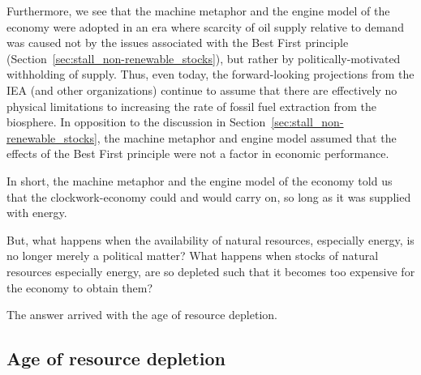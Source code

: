 Furthermore, we see that the machine metaphor and the engine model of the economy
were adopted in an era where scarcity of oil supply relative to demand was caused
not by the issues associated 
with the Best First principle (Section~\ref{sec:stall_non-renewable_stocks}),
but rather 
by politically-motivated withholding of supply.
Thus, even today, the forward-looking projections from the IEA 
(and other organizations)
continue to assume that there are effectively no physical limitations
to increasing the rate of fossil fuel extraction from the biosphere.
In opposition to the discussion 
in Section~\ref{sec:stall_non-renewable_stocks},
the machine metaphor and engine model assumed that 
the effects of the Best First principle 
were not a factor in economic performance.

In short, the machine metaphor and the engine model of the economy 
told us that the clockwork-economy could and would carry on,
so long as it was supplied with energy.

But, what happens when the availability of natural resources, 
especially energy,
is no longer merely a political matter?
What happens when stocks of natural resources
especially energy,
are so depleted such that
it becomes too expensive for the economy to obtain them?

The answer arrived with the age of resource depletion.


\subsection{Age of resource depletion}
\label{sec:age_of_resource_depletion}

